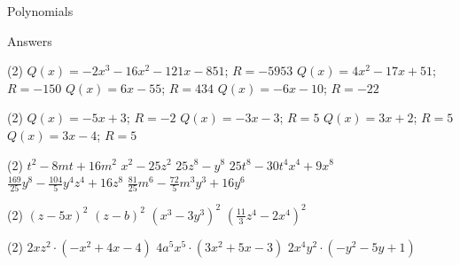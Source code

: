 \documentclass[a4paper]{article}
\begin{document}
\begin{itemize}
\begin{section}{Polynomials}
\begin{itemize}
  \end{itemize}
  \end{section}
  \begin{section}{Answers}
    \begin{tasks}(2)
      \task $Q(x)=-2 x^{3} -16 x^{2} -121 x -851 $; $R=-5953 $ 
      \task $Q(x)=4 x^{2} -17 x + 51 $; $R=-150 $ 
      \task $Q(x)=6 x -55 $; $R=434 $ 
      \task $Q(x)=-6 x -10 $; $R=-22 $ 
    \end{tasks}
    \begin{tasks}(2)
      \task $Q(x)=-5 x + 3 $; $R=-2 $ 
      \task $Q(x)=-3 x -3 $; $R=5 $ 
      \task $Q(x)=3 x + 2 $; $R=5 $ 
      \task $Q(x)=3 x -4 $; $R=5 $ 
    \end{tasks}
    \begin{tasks}(2)
      \task $t^{2} -8 m t +16 m^{2}$ 
      \task $x^{2} -25 z^{2}$ 
      \task $25 z^{8} -y^{8}$ 
      \task $25 t^{8} -30 t^{4} x^{4} +9 x^{8}$ 
      \task $\frac{169}{25} y^{8} -\frac{104}{5} y^{4} z^{4} +16 z^{8}$ 
      \task $\frac{81}{25} m^{6} -\frac{72}{5} m^{3} y^{3} +16 y^{6}$ 
    \end{tasks}
    \begin{tasks}(2)
      \task $\left(z - 5 x\right)^2$ 
      \task $\left(z - b\right)^2$ 
      \task $\left(x^{3} - 3 y^{3}\right)^2$ 
      \task $\left(\frac{11}{3} z^{4} - 2 x^{4}\right)^2$ 
    \end{tasks}
    \begin{tasks}(2)
      \task $2 x z^{2} \cdot \left(-x^{2} +4 x -4\right)$ 
      \task $4 a^{5} x^{5} \cdot \left(3 x^{2} +5 x -3\right)$ 
      \task $2 x^{4} y^{2} \cdot \left(-y^{2} -5 y +1\right)$ 
    \end{tasks}
  \end{section}
     \end{itemize}
\end{document}
